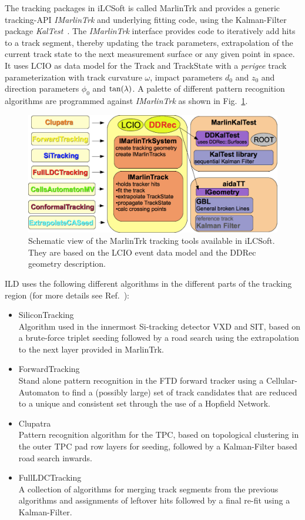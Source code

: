 The tracking packages in iLCSoft is called MarlinTrk and provides a generic tracking-API \emph{IMarlinTrk} and underlying fitting code,
using the Kalman-Filter package \emph{KalTest}~\cite{Li:2013cxa}.
The \emph{IMarlinTrk} interface provides code to iteratively add hits to a track segment,
thereby updating the track parameters, extrapolation of the current track state to the next measurement surface or any given point
in space. It uses LCIO as data model for the Track and TrackState with a \emph{perigee} track parameterization with
track curvature $\omega$, impact parameters $d_0$ and $z_0$ and direction parameters $\phi_0$ and $\rm{tan}(\lambda)$.
A palette of different pattern recognition algorithms are programmed against \emph{IMarlinTrk} as shown in Fig.~\ref{fig:imarlintrk}.
\begin{figure}
\begin{center}
\includegraphics[width=0.80\hsize]{chapters/figures/IMarlinTrk_ddkaltest_new.png}
\end{center}
\caption{Schematic view of the MarlinTrk tracking tools available in iLCSoft. They are based on the LCIO event data model and the
DDRec geometry description.}
\label{fig:imarlintrk}
\end{figure}
ILD uses the following different algorithms in the different parts of the tracking region
(for more details see Ref.~\cite{Gaede:2014aza}):

\begin{itemize}
\item SiliconTracking\\
  Algorithm used in the innermost Si-tracking detector VXD and SIT,
  based on a brute-force triplet seeding followed by
  a road search using the extrapolation to the next layer provided in MarlinTrk.
\item ForwardTracking\\
  Stand alone pattern recognition in the FTD forward tracker using a
  Cellular-Automaton to find a 
(possibly large) set of
  track candidates that are reduced to a unique and consistent set through the use of a Hopfield Network.
\item Clupatra\\
  Pattern recognition algorithm for the TPC, based on topological clustering in the outer TPC pad row layers for seeding,
  followed by a Kalman-Filter based road search inwards.
\item FullLDCTracking\\
  A collection of algorithms for merging track segments from the previous algorithms and assignments of leftover hits followed
  by a final re-fit using a Kalman-Filter.
\end{itemize}

